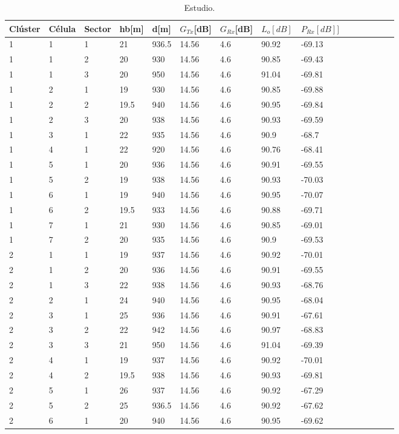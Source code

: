 \documentclass[11pt,letterpaper]{article}
\begin{document}
\begin{table}[ht]
    \centering
    \begin{tabular}{|l|l|l|l|l|l|l|l|l|l|l|l|l|l|l|}
    \hline
    Clúster & Célula & Sector & hb[m] & d[m] & $G_{Tx}$[dB] & $G_{Rx}$[dB] & $L_o[dB]$ & $P_{Rx}[dB]]$ \\ \hline
    1 & 1 & 1 & 21 & 936.5 & 14.56 & 4.6 & 90.92 & -69.13 \\ \hline
    1 & 1 & 2 & 20 & 930 & 14.56 & 4.6 & 90.85 & -69.43 \\ \hline
    1 & 1 & 3 & 20 & 950 & 14.56 & 4.6 & 91.04 & -69.81 \\ \hline
    1 & 2 & 1 & 19 & 930 & 14.56 & 4.6 & 90.85 & -69.88 \\ \hline
    1 & 2 & 2 & 19.5 & 940 & 14.56 & 4.6 & 90.95 & -69.84 \\ \hline
    1 & 2 & 3 & 20 & 938 & 14.56 & 4.6 & 90.93 & -69.59 \\ \hline
    1 & 3 & 1 & 22 & 935 & 14.56 & 4.6 & 90.9 & -68.7 \\ \hline
    1 & 4 & 1 & 22 & 920 & 14.56 & 4.6 & 90.76 & -68.41 \\ \hline
    1 & 5 & 1 & 20 & 936 & 14.56 & 4.6 & 90.91 & -69.55 \\ \hline
    1 & 5 & 2 & 19 & 938 & 14.56 & 4.6 & 90.93 & -70.03 \\ \hline
    1 & 6 & 1 & 19 & 940 & 14.56 & 4.6 & 90.95 & -70.07 \\ \hline
    1 & 6 & 2 & 19.5 & 933 & 14.56 & 4.6 & 90.88 & -69.71 \\ \hline
    1 & 7 & 1 & 21 & 930 & 14.56 & 4.6 & 90.85 & -69.01 \\ \hline
    1 & 7 & 2 & 20 & 935 & 14.56 & 4.6 & 90.9 & -69.53 \\ \hline
    2 & 1 & 1 & 19 & 937 & 14.56 & 4.6 & 90.92 & -70.01 \\ \hline
    2 & 1 & 2 & 20 & 936 & 14.56 & 4.6 & 90.91 & -69.55 \\ \hline
    2 & 1 & 3 & 22 & 938 & 14.56 & 4.6 & 90.93 & -68.76 \\ \hline
    2 & 2 & 1 & 24 & 940 & 14.56 & 4.6 & 90.95 & -68.04 \\ \hline
    2 & 3 & 1 & 25 & 936 & 14.56 & 4.6 & 90.91 & -67.61 \\ \hline
    2 & 3 & 2 & 22 & 942 & 14.56 & 4.6 & 90.97 & -68.83 \\ \hline
    2 & 3 & 3 & 21 & 950 & 14.56 & 4.6 & 91.04 & -69.39 \\ \hline
    2 & 4 & 1 & 19 & 937 & 14.56 & 4.6 & 90.92 & -70.01 \\ \hline
    2 & 4 & 2 & 19.5 & 938 & 14.56 & 4.6 & 90.93 & -69.81 \\ \hline
    2 & 5 & 1 & 26 & 937 & 14.56 & 4.6 & 90.92 & -67.29 \\ \hline
    2 & 5 & 2 & 25 & 936.5 & 14.56 & 4.6 & 90.92 & -67.62 \\ \hline
    2 & 6 & 1 & 20 & 940 & 14.56 & 4.6 & 90.95 & -69.62 \\ \hline
    \end{tabular}
    \caption{Estudio.}
\end{table}
\end{document}
